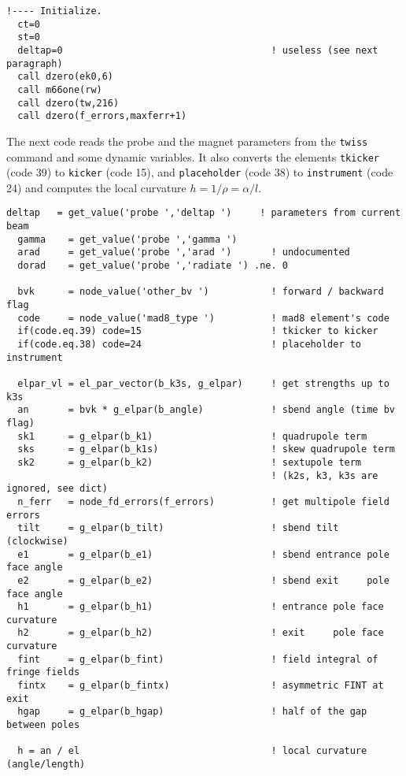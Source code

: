 \documentclass{cern-art} %
\renewcommand{\L}[1]{\lstinline[firstnumber=last]{#1}}
\begin{document}
\begin{lstlisting}[firstnumber=last]
  !---- Initialize.
  ct=0
  st=0
  deltap=0                                     ! useless (see next paragraph)
  call dzero(ek0,6)
  call m66one(rw)
  call dzero(tw,216)
  call dzero(f_errors,maxferr+1)
\end{lstlisting}
The next code reads the probe and the magnet parameters from the \L{twiss} command and some dynamic variables. It also converts the elements \L{tkicker} (code 39) to \L{kicker} (code 15), and \L{placeholder} (code 38) to \L{instrument} (code 24) and computes the local curvature $h=1/\rho=\alpha/l$.
\begin{lstlisting}[firstnumber=last]
  deltap   = get_value('probe ','deltap ')     ! parameters from current beam
  gamma    = get_value('probe ','gamma ')
  arad     = get_value('probe ','arad ')       ! undocumented
  dorad    = get_value('probe ','radiate ') .ne. 0
  
  bvk      = node_value('other_bv ')           ! forward / backward flag
  code     = node_value('mad8_type ')          ! mad8 element's code
  if(code.eq.39) code=15                       ! tkicker to kicker
  if(code.eq.38) code=24                       ! placeholder to instrument

  elpar_vl = el_par_vector(b_k3s, g_elpar)     ! get strengths up to k3s
  an       = bvk * g_elpar(b_angle)            ! sbend angle (time bv flag)
  sk1      = g_elpar(b_k1)                     ! quadrupole term
  sks      = g_elpar(b_k1s)                    ! skew quadrupole term
  sk2      = g_elpar(b_k2)                     ! sextupole term
                                               ! (k2s, k3, k3s are ignored, see dict)
  n_ferr   = node_fd_errors(f_errors)          ! get multipole field errors
  tilt     = g_elpar(b_tilt)                   ! sbend tilt (clockwise)
  e1       = g_elpar(b_e1)                     ! sbend entrance pole face angle
  e2       = g_elpar(b_e2)                     ! sbend exit     pole face angle
  h1       = g_elpar(b_h1)                     ! entrance pole face curvature
  h2       = g_elpar(b_h2)                     ! exit     pole face curvature
  fint     = g_elpar(b_fint)                   ! field integral of fringe fields
  fintx    = g_elpar(b_fintx)                  ! asymmetric FINT at exit
  hgap     = g_elpar(b_hgap)                   ! half of the gap between poles

  h = an / el                                  ! local curvature (angle/length)
\end{lstlisting}
\end{document}
